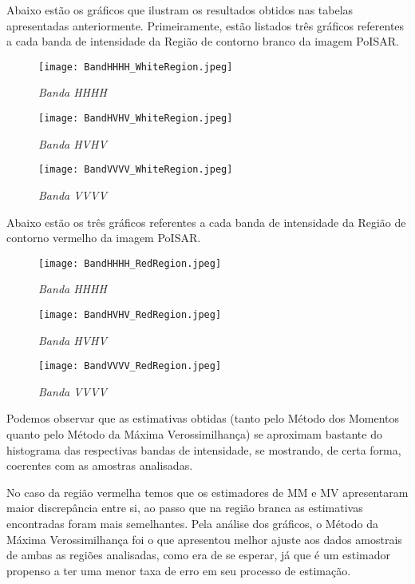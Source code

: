 Abaixo estão os gráficos que ilustram os resultados obtidos nas tabelas apresentadas anteriormente. Primeiramente, estão listados três gráficos referentes a cada banda de intensidade da Região de contorno branco da imagem PoISAR. 
\begin{figure}[H]
     \centering
     \texttt{[image: BandHHHH\_WhiteRegion.jpeg]}
     \caption{\textit{Banda HHHH}}
     \label{graf_1}
\end{figure}
\begin{figure}[H]
     \centering
     \texttt{[image: BandHVHV\_WhiteRegion.jpeg]}
     \caption{\textit{Banda HVHV}}
     \label{graf_2}
\end{figure}
\begin{figure}[H]
     \centering
     \texttt{[image: BandVVVV\_WhiteRegion.jpeg]}
     \caption{\textit{Banda VVVV}}
     \label{graf_3}
\end{figure}

Abaixo estão os três gráficos referentes a cada banda de intensidade da Região de contorno vermelho da imagem PoISAR.
\begin{figure}[H]
     \centering
     \texttt{[image: BandHHHH\_RedRegion.jpeg]}
     \caption{\textit{Banda HHHH}}
     \label{graf_1}
\end{figure}
\begin{figure}[H]
     \centering
     \texttt{[image: BandHVHV\_RedRegion.jpeg]}
     \caption{\textit{Banda HVHV}}
     \label{graf_2}
\end{figure}
\begin{figure}[H]
     \centering
     \texttt{[image: BandVVVV\_RedRegion.jpeg]}
     \caption{\textit{Banda VVVV}}
     \label{graf_3}
\end{figure}


Podemos observar que as estimativas obtidas (tanto pelo Método dos Momentos quanto pelo Método da Máxima Verossimilhança) se aproximam bastante do histograma das respectivas bandas de intensidade, se mostrando, de certa forma, coerentes com as amostras analisadas.

No caso da região vermelha temos que os estimadores de MM e MV apresentaram maior discrepância entre si, ao passo que na região branca as estimativas encontradas foram mais semelhantes. Pela análise dos gráficos, o Método da Máxima Verossimilhança foi o que apresentou melhor ajuste aos dados amostrais de ambas as regiões analisadas, como era de se esperar, já que é um estimador propenso a ter uma menor taxa de erro em seu processo de estimação. 

\newpage

%


%


